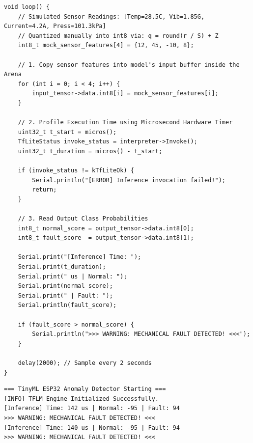 \begin{lstlisting}[style=pythonstyle, caption={Idiomatic C++ Arduino/ESP32 sketch executing inference with TFLM.}, label={lst:embedded_cpp_sketch}]
void loop() {
    // Simulated Sensor Readings: [Temp=28.5C, Vib=1.85G, Current=4.2A, Press=101.3kPa]
    // Quantized manually into int8 via: q = round(r / S) + Z
    int8_t mock_sensor_features[4] = {12, 45, -10, 8};

    // 1. Copy sensor features into model's input buffer inside the Arena
    for (int i = 0; i < 4; i++) {
        input_tensor->data.int8[i] = mock_sensor_features[i];
    }

    // 2. Profile Execution Time using Microsecond Hardware Timer
    uint32_t t_start = micros();
    TfLiteStatus invoke_status = interpreter->Invoke();
    uint32_t t_duration = micros() - t_start;

    if (invoke_status != kTfLiteOk) {
        Serial.println("[ERROR] Inference invocation failed!");
        return;
    }

    // 3. Read Output Class Probabilities
    int8_t normal_score = output_tensor->data.int8[0];
    int8_t fault_score  = output_tensor->data.int8[1];

    Serial.print("[Inference] Time: ");
    Serial.print(t_duration);
    Serial.print(" us | Normal: ");
    Serial.print(normal_score);
    Serial.print(" | Fault: ");
    Serial.println(fault_score);

    if (fault_score > normal_score) {
        Serial.println(">>> WARNING: MECHANICAL FAULT DETECTED! <<<");
    }

    delay(2000); // Sample every 2 seconds
}
\end{lstlisting}

\begin{lstlisting}[style=outputstyle, caption={Serial Monitor output from the ESP32 running TFLM.}]
=== TinyML ESP32 Anomaly Detector Starting ===
[INFO] TFLM Engine Initialized Successfully.
[Inference] Time: 142 us | Normal: -95 | Fault: 94
>>> WARNING: MECHANICAL FAULT DETECTED! <<<
[Inference] Time: 140 us | Normal: -95 | Fault: 94
>>> WARNING: MECHANICAL FAULT DETECTED! <<<
\end{lstlisting}

